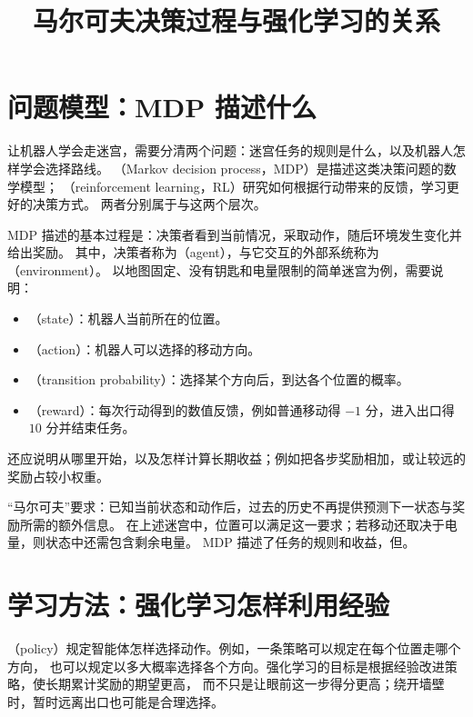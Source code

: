 \documentclass[UTF8]{ctexart}
\title{马尔可夫决策过程与强化学习的关系}
\author{}
\date{}
\begin{document}
\maketitle

\section{问题模型：MDP 描述什么}
\label{sec:relation-mdp}

让机器人学会走迷宫，需要分清两个问题：迷宫任务的规则是什么，以及机器人怎样学会选择路线。
（Markov decision process，MDP）是描述这类决策问题的数学模型；
（reinforcement learning，RL）研究如何根据行动带来的反馈，学习更好的决策方式。
两者分别属于与这两个层次。

MDP 描述的基本过程是：决策者看到当前情况，采取动作，随后环境发生变化并给出奖励。
其中，决策者称为（agent），与它交互的外部系统称为（environment）。
以地图固定、没有钥匙和电量限制的简单迷宫为例，需要说明：
\begin{itemize}
  \item {}（state）：机器人当前所在的位置。
  \item {}（action）：机器人可以选择的移动方向。
  \item {}（transition probability）：选择某个方向后，到达各个位置的概率。
  \item {}（reward）：每次行动得到的数值反馈，例如普通移动得 $-1$ 分，进入出口得 $10$ 分并结束任务。
\end{itemize}
还应说明从哪里开始，以及怎样计算长期收益；例如把各步奖励相加，或让较远的奖励占较小权重。

“马尔可夫”要求：已知当前状态和动作后，过去的历史不再提供预测下一状态与奖励所需的额外信息。
在上述迷宫中，位置可以满足这一要求；若移动还取决于电量，则状态中还需包含剩余电量。
MDP 描述了任务的规则和收益，但。

\section{学习方法：强化学习怎样利用经验}
\label{sec:relation-learning}

（policy）规定智能体怎样选择动作。例如，一条策略可以规定在每个位置走哪个方向，
也可以规定以多大概率选择各个方向。强化学习的目标是根据经验改进策略，使长期累计奖励的期望更高，
而不只是让眼前这一步得分更高；绕开墙壁时，暂时远离出口也可能是合理选择。
\end{document}
